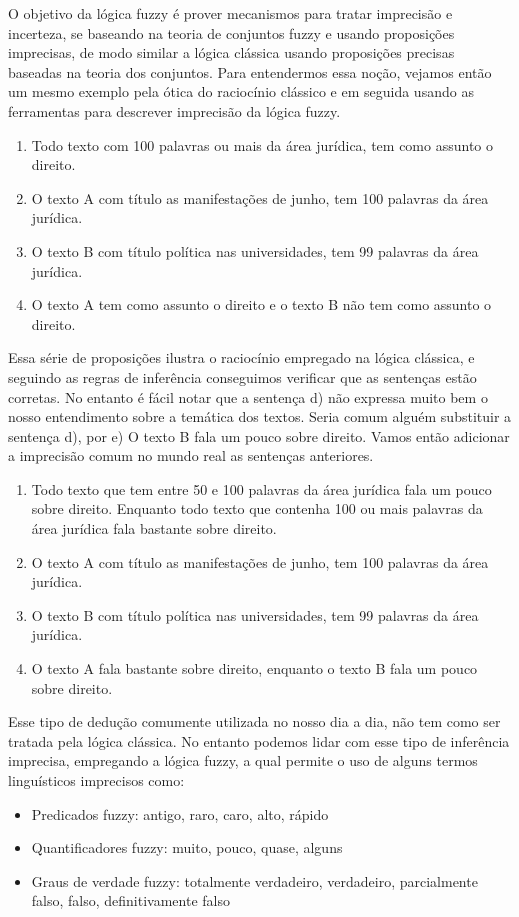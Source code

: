O objetivo da lógica fuzzy é prover mecanismos para tratar imprecisão e incerteza, se baseando na
teoria de conjuntos fuzzy e usando proposições imprecisas, de modo similar a lógica clássica 
usando proposições precisas baseadas na teoria dos conjuntos. 
Para entendermos essa noção, vejamos então um mesmo exemplo pela ótica do raciocínio clássico e 
em seguida usando as ferramentas para descrever imprecisão da lógica fuzzy. 
\begin{enumerate}[label=\alph*)]
  \item Todo texto com 100 palavras ou mais da área jurídica, tem como assunto o direito.
  \item O texto A com título as manifestações de junho, tem 100 palavras da área jurídica.
  \item O texto B com título política nas universidades, tem 99 palavras da área jurídica. 
  \item O texto A tem como assunto o direito e o texto B não tem como assunto o direito.
\end{enumerate}
Essa série de proposições ilustra o raciocínio empregado na lógica clássica, e seguindo as regras
de inferência conseguimos verificar que as sentenças estão corretas. No entanto é fácil notar que
a sentença d) não expressa muito bem o nosso entendimento sobre a temática dos textos.
Seria comum alguém substituir a sentença d), por e) O texto B fala um pouco sobre direito. 
Vamos então adicionar a imprecisão comum no mundo real as sentenças anteriores.
\begin{enumerate}[label=\alph*)]
  \item Todo texto que tem entre 50 e 100 palavras da área jurídica fala um pouco sobre direito. 
Enquanto todo texto que contenha 100 ou mais palavras da área jurídica fala bastante sobre direito.
  \item O texto A com título as manifestações de junho, tem 100 palavras da área jurídica.
  \item O texto B com título política nas universidades, tem 99 palavras da área jurídica. 
  \item O texto A fala bastante sobre direito, enquanto o texto B fala um pouco sobre direito.
\end{enumerate}
Esse tipo de dedução comumente utilizada no nosso dia a dia, não tem como ser tratada pela lógica
clássica. No entanto podemos lidar com esse tipo de inferência imprecisa, empregando a lógica fuzzy, a qual permite o uso de alguns termos linguísticos imprecisos como:
\begin{itemize}
  \item Predicados fuzzy: antigo, raro, caro, alto, rápido
  \item Quantificadores fuzzy: muito, pouco, quase, alguns
  \item Graus de verdade fuzzy: totalmente verdadeiro, verdadeiro, parcialmente falso, falso, definitivamente falso
\end{itemize}

